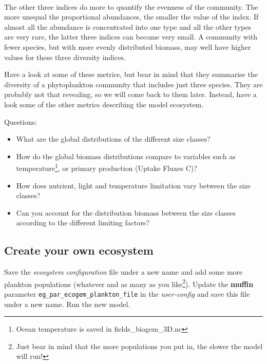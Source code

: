 \documentclass[11pt,fleqn]{book} %
\begin{document}
\begin{itemize}[noitemsep]
\begin{itemize}[noitemsep]
\\The other three indices do more to quantify the evenness of the community. The more unequal the proportional abundances, the smaller the value of the index. If almost all the abundance is concentrated into one type and all the other types are very rare, the latter three indices can become very small. A community with fewer species, but with more evenly distributed biomass, may well have higher values for these three diversity indices.
\end{itemize}
\vspace{1mm}

\end{itemize}
\vspace{1mm}

\pagebreak

Have a look at some of these metrics, but bear in mind that they summarise the diversity of a phytoplankton community that includes just three species. They are probably not that revealing, so we will come back to them later. Instead, have a look some of the other metrics describing the model ecosystem.

\vspace{1mm}
Questions:
\vspace{1mm}
\begin{itemize}
\item What are the global distributions of the different size classes?
\item How do the global biomass distributions compare to variables such as temperature\footnote{Ocean temperature is saved in \textsf{\scriptsize fields\_biogem\_3D.nc}}, or primary production (\textsf{\footnotesize Uptake Fluxes C})?
\item How does nutrient, light and temperature limitation vary between the size classes?
\item Can you account for the distribution biomass between the size classes according to the different limiting factors?
\end{itemize}
\vspace{2mm}


\subsection{Create your own ecosystem}

Save the \textit{ecosystem configuration} file under a new name and add some more plankton populations (whatever and as many as you like\footnote{Just bear in mind that the more populations you put in, the slower the model will run!}). Update the \textbf{muffin} parameter \texttt{eg\_par\_ecogem\_plankton\_file} in the \textit{user-config} and save this file under a new name.  Run the new model.
\end{document}
